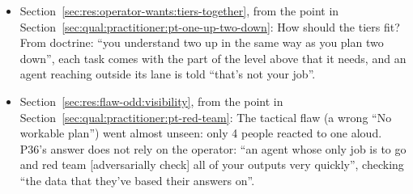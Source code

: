 \begin{itemize}[leftmargin=1.2em,itemsep=1pt]
\item Section~\ref{sec:res:operator-wants:tiers-together}, from the point in Section~\ref{sec:qual:practitioner:pt-one-up-two-down}: How should the tiers fit? From doctrine: ``you understand two up in the same way as you plan two down'', each task comes with the part of the level above that it needs, and an agent reaching outside its lane is told ``that's not your job''.
\item Section~\ref{sec:res:flaw-odd:visibility}, from the point in Section~\ref{sec:qual:practitioner:pt-red-team}: The tactical flaw (a wrong ``No workable plan'') went almost unseen: only 4 people reacted to one aloud. P36's answer does not rely on the operator: ``an agent whose only job is to go and red team [adversarially check] all of your outputs very quickly'', checking ``the data that they've based their answers on''.
\end{itemize}

